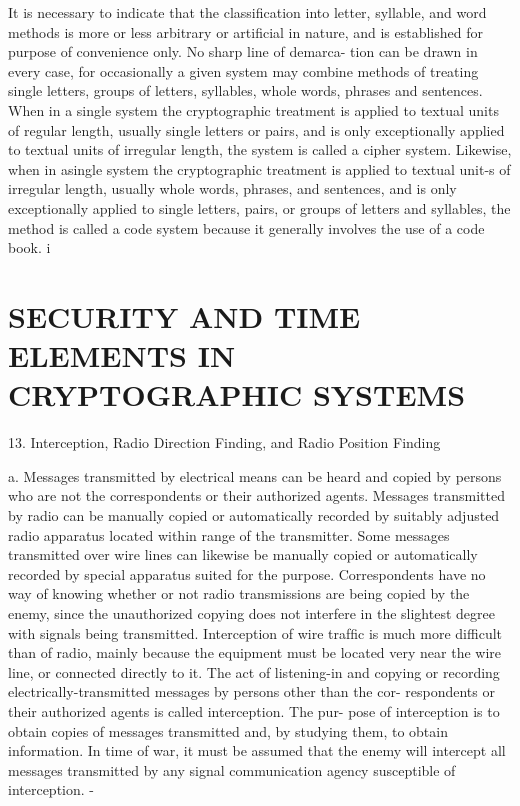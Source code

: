 It is necessary to indicate that the classiﬁcation into letter, syllable,
and word methods is more or less arbitrary or artiﬁcial in nature, and is
established for purpose of convenience only. No sharp line of demarca-
tion can be drawn in every case, for occasionally a given system may
combine methods of treating single letters, groups of letters, syllables,
whole words, phrases and sentences. When in a single system the
cryptographic treatment is applied to textual units of regular length,
usually single letters or pairs, and is only exceptionally applied to textual
units of irregular length, the system is called a cipher system. Likewise,
when in asingle system the cryptographic treatment is applied to textual
unit-s of irregular length, usually whole words, phrases, and sentences,
and is only exceptionally applied to single letters, pairs, or groups of
letters and syllables, the method is called a code system because it
generally involves the use of a code book. i

 

\section{SECURITY AND TIME ELEMENTS IN CRYPTOGRAPHIC SYSTEMS}

13. Interception, Radio Direction Finding, and Radio Position
Finding

a. Messages transmitted by electrical means can be heard and copied
by persons who are not the correspondents or their authorized agents.
Messages transmitted by radio can be manually copied or automatically
recorded by suitably adjusted radio apparatus located within range of the
transmitter. Some messages transmitted over wire lines can likewise be
manually copied or automatically recorded by special apparatus suited
for the purpose. Correspondents have no way of knowing whether or not
radio transmissions are being copied by the enemy, since the unauthorized
copying does not interfere in the slightest degree with signals being
transmitted. Interception of wire trafﬁc is much more difficult than of
radio, mainly because the equipment must be located very near the wire
line, or connected directly to it. The act of listening-in and copying or
recording electrically-transmitted messages by persons other than the cor-
respondents or their authorized agents is called interception. The pur-
pose of interception is to obtain copies of messages transmitted and, by
studying them, to obtain information. In time of war, it must be assumed
that the enemy will intercept all messages transmitted by any signal
communication agency susceptible of interception. -

